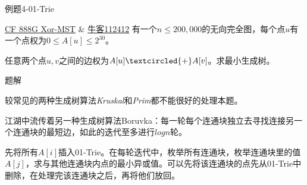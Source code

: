 \documentclass{ctexbeamer}		%
\begin{document}
\begin{frame}{例题4-01-Trie}
    
\begin{block}{\href{http://codeforces.com/contest/888/problem/G}{CF 888G Xor-MST} \& \href{https://ac.nowcoder.com/acm/problem/112412}{牛客112412}}
有一个$n\leq 200,000$的无向完全图，每个点$u$有一个点权为$0\leq A[u]\leq 2^{30}$。

任意两个点$u,v$之间的边权为$A[u] \textcircled{+} A[v]$。求最小生成树。
\end{block}

\pause

\begin{block}{题解}

较常见的两种生成树算法\textit{Kruskal}和\textit{Prim}都不能很好的处理本题。

\pause

江湖中流传着另一种生成树算法Boruvka：每一轮每个连通块独立去寻找连接另一个连通块的最短边，如此的迭代至多进行$logn$轮。

\pause

先将所有$A[i]$插入01-Trie。在每轮迭代中，枚举所有连通块，枚举连通块里的值$A[j]$，求与其他连通块内点的最小异或值。可以先将该连通块的点先从01-Trie中删除，在处理完该连通块之后，再将他们放回。

\end{block}
\end{frame}
\end{document}
